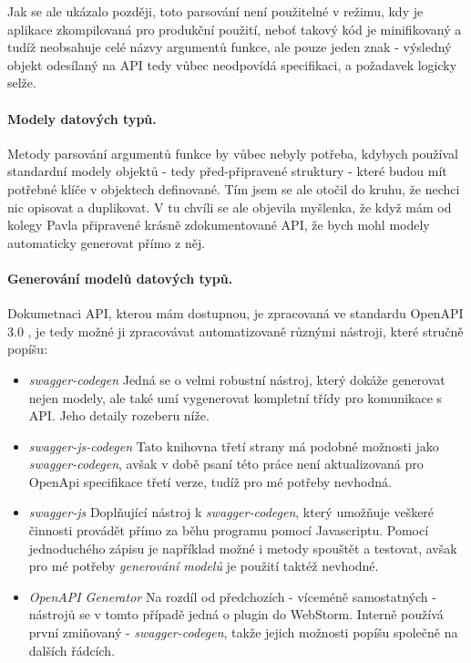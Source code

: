 Jak se ale ukázalo později, toto parsování není použitelné v režimu, kdy je aplikace zkompilovaná pro produkční použití, neboť takový kód je minifikovaný a tudíž neobsahuje celé názvy argumentů funkce, ale pouze jeden znak - výsledný objekt odesílaný na API tedy vůbec neodpovídá specifikaci, a požadavek logicky selže.

\paragraph{Modely datových typů.} Metody parsování argumentů funkce by vůbec nebyly potřeba, kdybych používal standardní modely objektů - tedy před-připravené struktury - které budou mít potřebné klíče v objektech definované. Tím jsem se ale otočil do kruhu, že nechci nic opisovat a duplikovat. V tu chvíli se ale objevila myšlenka, že když mám od kolegy Pavla připravené krásně zdokumentované API, že bych mohl modely automaticky generovat přímo z něj.

\paragraph{Generování modelů datových typů.} Dokumetnaci API, kterou mám dostupnou, je zpracovaná ve standardu OpenAPI 3.0 \cite{openapi-spec}, je tedy možné ji zpracovávat automatizovaně různými nástroji, které stručně popíšu:

\begin{itemize}
    \item \emph{swagger-codegen} \cite{swagger-codegen} Jedná se o velmi robustní nástroj, který dokáže generovat nejen modely, ale také umí vygenerovat kompletní třídy pro komunikace s API. Jeho detaily rozeberu níže.
    \item \emph{swagger-js-codegen} \cite{swagger-js-codegen} Tato knihovna třetí strany má podobné možnosti jako \emph{swagger-codegen}, avšak v době psaní této práce není aktualizovaná pro OpenApi specifikace třetí verze, tudíž pro mé potřeby nevhodná.
    \item \emph{swagger-js} \cite{swagger-js} Doplňující nástroj k \emph{swagger-codegen}, který umožňuje veškeré činnosti provádět přímo za běhu programu pomocí Javascriptu. Pomocí jednoduchého zápisu je například možné i metody spouštět a testovat, avšak pro mé potřeby \emph{generování modelů} je použití taktéž nevhodné.
    \item \emph{OpenAPI Generator} \cite{openapi-generator} Na rozdíl od předchozích - víceméně samostatných - nástrojů se v tomto případě jedná o plugin do WebStorm. Interně používá první zmiňovaný - \emph{swagger-codegen}, takže jejich možnosti popíšu společně na dalších řádcích.
\end{itemize}

